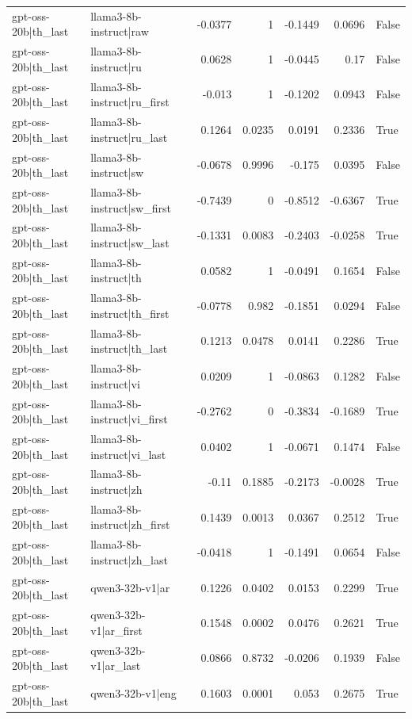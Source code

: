 \begin{table}
\begin{tabular}{l l r r r r l}
gpt-oss-20b|th_last & llama3-8b-instruct|raw & -0.0377 & 1 & -0.1449 & 0.0696 & False \\
gpt-oss-20b|th_last & llama3-8b-instruct|ru & 0.0628 & 1 & -0.0445 & 0.17 & False \\
gpt-oss-20b|th_last & llama3-8b-instruct|ru_first & -0.013 & 1 & -0.1202 & 0.0943 & False \\
gpt-oss-20b|th_last & llama3-8b-instruct|ru_last & 0.1264 & 0.0235 & 0.0191 & 0.2336 & True \\
gpt-oss-20b|th_last & llama3-8b-instruct|sw & -0.0678 & 0.9996 & -0.175 & 0.0395 & False \\
gpt-oss-20b|th_last & llama3-8b-instruct|sw_first & -0.7439 & 0 & -0.8512 & -0.6367 & True \\
gpt-oss-20b|th_last & llama3-8b-instruct|sw_last & -0.1331 & 0.0083 & -0.2403 & -0.0258 & True \\
gpt-oss-20b|th_last & llama3-8b-instruct|th & 0.0582 & 1 & -0.0491 & 0.1654 & False \\
gpt-oss-20b|th_last & llama3-8b-instruct|th_first & -0.0778 & 0.982 & -0.1851 & 0.0294 & False \\
gpt-oss-20b|th_last & llama3-8b-instruct|th_last & 0.1213 & 0.0478 & 0.0141 & 0.2286 & True \\
gpt-oss-20b|th_last & llama3-8b-instruct|vi & 0.0209 & 1 & -0.0863 & 0.1282 & False \\
gpt-oss-20b|th_last & llama3-8b-instruct|vi_first & -0.2762 & 0 & -0.3834 & -0.1689 & True \\
gpt-oss-20b|th_last & llama3-8b-instruct|vi_last & 0.0402 & 1 & -0.0671 & 0.1474 & False \\
gpt-oss-20b|th_last & llama3-8b-instruct|zh & -0.11 & 0.1885 & -0.2173 & -0.0028 & True \\
gpt-oss-20b|th_last & llama3-8b-instruct|zh_first & 0.1439 & 0.0013 & 0.0367 & 0.2512 & True \\
gpt-oss-20b|th_last & llama3-8b-instruct|zh_last & -0.0418 & 1 & -0.1491 & 0.0654 & False \\
gpt-oss-20b|th_last & qwen3-32b-v1|ar & 0.1226 & 0.0402 & 0.0153 & 0.2299 & True \\
gpt-oss-20b|th_last & qwen3-32b-v1|ar_first & 0.1548 & 0.0002 & 0.0476 & 0.2621 & True \\
gpt-oss-20b|th_last & qwen3-32b-v1|ar_last & 0.0866 & 0.8732 & -0.0206 & 0.1939 & False \\
gpt-oss-20b|th_last & qwen3-32b-v1|eng & 0.1603 & 0.0001 & 0.053 & 0.2675 & True \\

\end{tabular}
\end{table}
